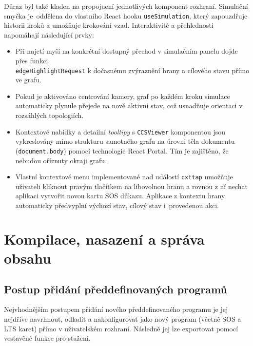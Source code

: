 Důraz byl také kladen na propojuení jednotlivých komponent rozhraní. 
Simulační smyčka je~oddělena do vlastního React hooku \texttt{useSimulation}, který zapouzdřuje historii kroků a umožňuje krokování vzad. 
Interaktivitě a přehlednosti napomáhají následující prvky:
\begin{itemize}
    \item Při najetí myší na konkrétní dostupný přechod v simulačním panelu dojde přes funkci\\\texttt{edgeHighlightRequest} k dočasnému zvýraznění hrany a cílového stavu přímo ve grafu.
    \item Pokud je aktivováno centrování kamery, graf po každém kroku simulace automaticky plynule přejede na nově aktivní stav, což usnadňuje orientaci v rozsáhlých topologiích.
    \item Kontextové nabídky a detailní \textit{tooltipy} s \texttt{CCSViewer} komponentou jsou vykreslovány mimo strukturu samotného grafu na úrovni těla dokumentu (\texttt{document.body}) pomocí technologie React Portal. 
    Tím je zajištěno, že nebudou oříznuty okraji grafu.
    \item Vlastní kontextové menu implementované nad událostí \texttt{cxttap} umožňuje uživateli kliknout pravým tlačítkem na libovolnou hranu a rovnou z ní nechat aplikaci vytvořit novou kartu SOS důkazu. 
    Aplikace z kontextu hrany automaticky předvyplní výchozí stav, cílový stav i~provedenou akci.
\end{itemize}


\section{Kompilace, nasazení a správa obsahu}

\subsection{Postup přidání předdefinovaných programů}
Nejvhodnějším postupem přidání nového předdefinovaného programu je jej nejdříve navrhnout, odladit a nakonfigurovat jako nový program (včetně SOS a LTS karet) přímo v uživatelském rozhraní. 
Následně jej lze exportovat pomocí vestavěné funkce pro stažení.

